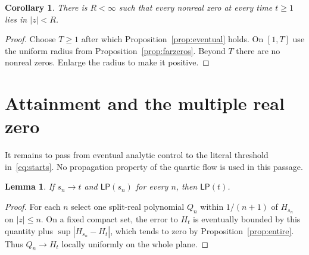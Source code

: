 \documentclass[11pt]{article}
\newtheorem{lemma}[theorem]{Lemma}
\newtheorem{corollary}[theorem]{Corollary}
\theoremstyle{remark}\newtheorem{remark}[theorem]{Remark}
\begin{document}
\begin{corollary}\label{cor:confine}
There is $R<\infty$ such that every nonreal zero at every
time $t\geq1$ lies in $|z|<R$.
\end{corollary}
\begin{proof}
Choose $T\geq1$ after which Proposition~\ref{prop:eventual}
holds. On $[1,T]$ use the uniform radius from
Proposition~\ref{prop:farzeros}. Beyond $T$ there are no
nonreal zeros. Enlarge the radius to make it positive.
\end{proof}

\section{Attainment and the multiple real zero}
It remains to pass from eventual analytic control to the
literal threshold in~\eqref{eq:starts}. No propagation
property of the quartic flow is used in this passage.

\begin{lemma}\label{lem:closedLP}
If $s_n\to t$ and $\mathsf{LP}(s_n)$ for every $n$, then
$\mathsf{LP}(t)$.
\end{lemma}
\begin{proof}
For each $n$ select one split-real polynomial $Q_n$ within
$1/(n+1)$ of $H_{s_n}$ on $|z|\leq n$. On a fixed compact
set, the error to $H_t$ is eventually bounded by this
quantity plus $\sup|H_{s_n}-H_t|$, which tends to zero by
Proposition~\ref{prop:entire}. Thus $Q_n\to H_t$ locally
uniformly on the whole plane.
\end{proof}
\end{document}
